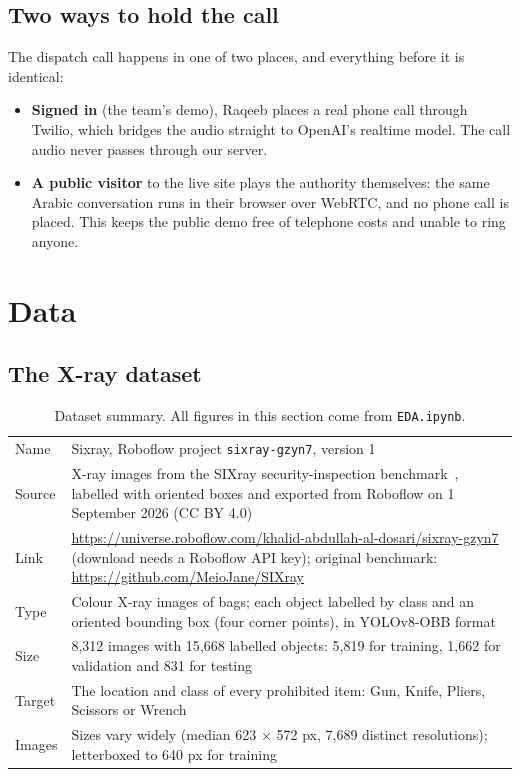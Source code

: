 \documentclass[11pt,a4paper]{article}
\newcommand{\code}[1]{\texttt{#1}}
\begin{document}
\subsection{Two ways to hold the call}

The dispatch call happens in one of two places, and everything before it is identical:
\begin{itemize}
  \item \textbf{Signed in} (the team's demo), Raqeeb places a real phone call through Twilio, which
        bridges the audio straight to OpenAI's realtime model. The call audio never passes through
        our server.
  \item \textbf{A public visitor} to the live site plays the authority themselves: the same Arabic
        conversation runs in their browser over WebRTC, and no phone call is placed. This keeps the
        public demo free of telephone costs and unable to ring anyone.
\end{itemize}

\section{Data}

\subsection{The X-ray dataset}

\begin{table}[H]
\centering
\small
\begin{tabularx}{\textwidth}{@{}B{3.1cm}L@{}}
\toprule
Name & Sixray, Roboflow project \code{sixray-gzyn7}, version 1 \\
Source & X-ray images from the SIXray security-inspection benchmark~\cite{sixray}, labelled with
         oriented boxes and exported from Roboflow on 1 September 2026 (CC BY 4.0) \\
Link & \url{https://universe.roboflow.com/khalid-abdullah-al-dosari/sixray-gzyn7} (download needs a
       Roboflow API key); original benchmark: \url{https://github.com/MeioJane/SIXray} \\
Type & Colour X-ray images of bags; each object labelled by class and an oriented bounding box
       (four corner points), in YOLOv8-OBB format \\
Size & 8,312 images with 15,668 labelled objects: 5,819 for training, 1,662 for validation and 831
       for testing \\
Target & The location and class of every prohibited item: Gun, Knife, Pliers, Scissors or Wrench \\
Images & Sizes vary widely (median 623 × 572 px, 7,689 distinct resolutions); letterboxed to 640 px
         for training \\
\bottomrule
\end{tabularx}
\caption{Dataset summary. All figures in this section come from \code{EDA.ipynb}.}
\end{table}
\end{document}
